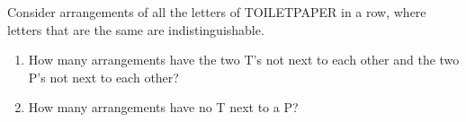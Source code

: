 Consider arrangements of all the letters of TOILETPAPER in a row, where letters that are the same are indistinguishable.
\begin{enumerate}
\item[(a)] How many arrangements have the two T's not next to each other and the two P's not next to each other?
\item[(b)] How many arrangements have no T next to a P?
\end{enumerate}
